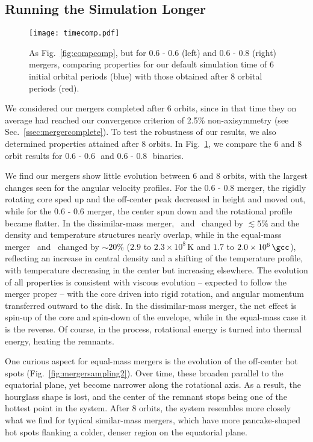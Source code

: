 \subsection{Running the Simulation Longer}
\label{ssec:runninglonger}

\begin{figure}
\centering
\texttt{[image: timecomp.pdf]}
\caption{As Fig.~\ref{fig:compcomp}, but for 0.6 - 0.6 {\Msun} (left) and 0.6 - 0.8 {\Msun} (right) mergers, comparing properties for our default simulation time of 6 initial orbital periods (blue) with those obtained after 8 orbital periods (red).}
\label{fig:timecomp}
\end{figure}

We considered our mergers completed after 6 orbits, since in that time they on average had reached our convergence criterion of 2.5\% non-axisymmetry (see Sec.~\ref{ssec:mergercomplete}).  To test the robustness of our results, we also determined properties attained after 8 orbits.  In Fig.~\ref{fig:timecomp}, we compare the 6 and 8 orbit results for 0.6 - 0.6\,\Msun\ and 0.6 - 0.8\,\Msun\ binaries.

We find our mergers show little evolution between 6 and 8 orbits, with the largest changes seen for the angular velocity profiles.  For the 0.6 - 0.8 {\Msun} merger, the rigidly rotating core sped up and the off-center peak decreased in height and moved out, while for the 0.6 - 0.6 {\Msun} merger, the center spun down and the rotational profile became flatter.  In the dissimilar-mass merger, \Tmax\ and \rhoTmax\ changed by $\lesssim\!5$\% and the density and temperature structures nearly overlap, while in the equal-mass merger \Tmax\ and \rhoTmax\ changed by $\sim\!20$\% ($2.9$ to $2.3\times10^8\,$K and $1.7$ to $2.0\times10^6\,\gcc$), reflecting an increase in central density and a shifting of the temperature profile, with temperature decreasing in the center but increasing elsewhere.  The evolution of all properties is consistent with viscous evolution -- expected to follow the merger proper -- with the core driven into rigid rotation, and angular momentum transferred outward to the disk.  In the dissimilar-mass merger, the net effect is spin-up of the core and spin-down of the envelope, while in the equal-mass case it is the reverse.  Of course, in the process, rotational energy is turned into thermal energy, heating the remnants.

One curious aspect for equal-mass mergers is the evolution of the off-center hot spots (Fig.~\ref{fig:mergersampling2}).  Over time, these broaden parallel to the equatorial plane, yet become narrower along the rotational axis.  As a result, the hourglass shape is lost, and the center of the remnant stops being one of the hottest point in the system.  After 8 orbits, the system resembles more closely what we find for typical similar-mass mergers, which have more pancake-shaped hot spots flanking a colder, denser region on the equatorial plane.

